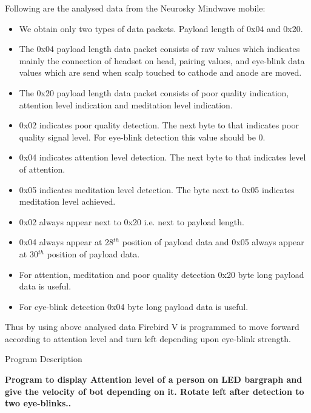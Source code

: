\documentclass[14pt]{article}
\begin{document}
{\raggedright
Following are the analysed data from the Neurosky Mindwave mobile:
}

\begin{itemize}
	\item We obtain only two types of data packets. Payload length of 0x04 and 0x20. 
	\item The 0x04 payload length data packet consists of raw values which indicates mainly the connection of headset on head, pairing values, and eye-blink data values which are send when scalp touched to cathode and anode are moved.
	\item The 0x20 payload length data packet consists of poor quality indication, attention level indication and meditation level indication.
	\item 0x02 indicates poor quality detection. The next byte to that indicates poor quality signal level. For eye-blink detection this value should be 0.
	\item 0x04 indicates attention level detection. The next byte to that indicates level of attention.
	\item 0x05 indicates meditation level detection. The byte next to 0x05 indicates meditation level achieved.
	\item 0x02 always appear next to 0x20 i.e. next to payload length.
	\item 0x04 always appear at 28$^{th}$ position of payload data and 0x05 always appear
at 30$^{th}$ position of payload data.
	\item For attention, meditation and poor quality detection 0x20 byte long payload data is useful.
	\item For eye-blink detection 0x04 byte long payload data is useful.
\end{itemize}

Thus by using above analysed data Firebird V is programmed to move forward according to attention level and turn left depending upon eye-blink strength.

\break

\begin{center}
{\Huge Program Description}
\end{center}

\textbf{{\large Program to display Attention level of a person on LED bargraph and give the velocity of bot depending on it. Rotate left after detection to two eye-blinks..}}
\end{document}
